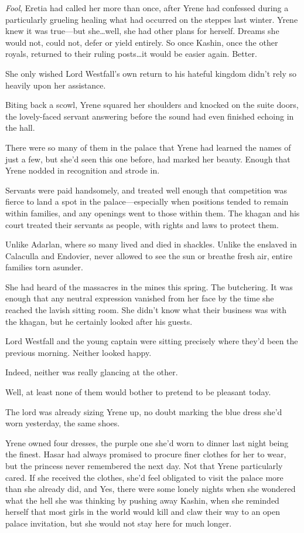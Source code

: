 \emph{Fool}, Eretia had called her more than once, after Yrene had confessed during a particularly grueling healing what had occurred on the steppes last winter.
Yrene knew it was true---but she\ldots well, she had other plans for herself.
Dreams she would not, could not, defer or yield entirely.
So once Kashin, once the other royals, returned to their ruling posts\ldots it would be easier again.
Better.

She only wished Lord Westfall's own return to his hateful kingdom didn't rely so heavily upon her assistance.

Biting back a scowl, Yrene squared her shoulders and knocked on the suite doors, the lovely-faced servant answering before the sound had even finished echoing in the hall.

There were so many of them in the palace that Yrene had learned the names of just a few, but she'd seen this one before, had marked her beauty.
Enough that Yrene nodded in recognition and strode in.

Servants were paid handsomely, and treated well enough that competition was fierce to land a spot in the palace---especially when positions tended to remain within families, and any openings went to those within them.
The khagan and his court treated their servants as people, with rights and laws to protect them.

Unlike Adarlan, where so many lived and died in shackles.
Unlike the enslaved in Calaculla and Endovier, never allowed to see the sun or breathe fresh air, entire families torn asunder.

She had heard of the massacres in the mines this spring.
The butchering.
It was enough that any neutral expression vanished from her face by the time she reached the lavish sitting room.
She didn't know what their business was with the khagan, but he certainly looked after his guests.

Lord Westfall and the young captain were sitting precisely where they'd been the previous morning.
Neither looked happy.

Indeed, neither was really glancing at the other.

Well, at least none of them would bother to pretend to be pleasant today.

The lord was already sizing Yrene up, no doubt marking the blue dress she'd worn yesterday, the same shoes.

Yrene owned four dresses, the purple one she'd worn to dinner last night being the finest.
Hasar had always promised to procure finer clothes for her to wear, but the princess never remembered the next day.
Not that Yrene particularly cared.
If she received the clothes, she'd feel obligated to visit the palace more than she already did, and 
Yes, there were some lonely nights when she wondered what the hell she was thinking by pushing away Kashin, when she reminded herself that most girls in the world would kill and claw their way to an open palace invitation, but she would not stay here for much longer.

